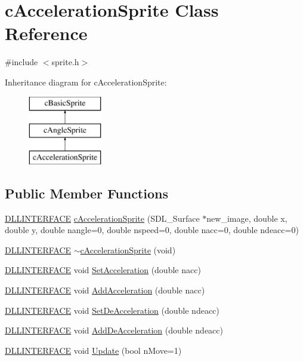 \hypertarget{classc_acceleration_sprite}{\section{c\-Acceleration\-Sprite Class Reference}
\label{classc_acceleration_sprite}
}


{\ttfamily \#include $<$sprite.\-h$>$}

Inheritance diagram for c\-Acceleration\-Sprite\-:\begin{figure}[H]
\begin{center}
\leavevmode
\includegraphics[height=3.000000cm]{classc_acceleration_sprite}
\end{center}
\end{figure}
\subsection*{Public Member Functions}
\begin{DoxyCompactItemize}
\item 
\hyperlink{_s_d_l__ep_8h_a38dd54df4631b4daf553096353d7b20b}{D\-L\-L\-I\-N\-T\-E\-R\-F\-A\-C\-E} \hyperlink{classc_acceleration_sprite_a07f0b3c9c2e7b865ecdb766a3304e285}{c\-Acceleration\-Sprite} (S\-D\-L\-\_\-\-Surface $\ast$new\-\_\-image, double x, double y, double nangle=0, double nspeed=0, double nacc=0, double ndeacc=0)
\item 
\hyperlink{_s_d_l__ep_8h_a38dd54df4631b4daf553096353d7b20b}{D\-L\-L\-I\-N\-T\-E\-R\-F\-A\-C\-E} \hyperlink{classc_acceleration_sprite_abca957dd38abb52fb0beffee462d9755}{$\sim$c\-Acceleration\-Sprite} (void)
\item 
\hyperlink{_s_d_l__ep_8h_a38dd54df4631b4daf553096353d7b20b}{D\-L\-L\-I\-N\-T\-E\-R\-F\-A\-C\-E} void \hyperlink{classc_acceleration_sprite_a4ba3eb35fd74945412de7f8560acb7b1}{Set\-Acceleration} (double nacc)
\item 
\hyperlink{_s_d_l__ep_8h_a38dd54df4631b4daf553096353d7b20b}{D\-L\-L\-I\-N\-T\-E\-R\-F\-A\-C\-E} void \hyperlink{classc_acceleration_sprite_a90b041c3156bd208c2ab568a77dfd2d7}{Add\-Acceleration} (double nacc)
\item 
\hyperlink{_s_d_l__ep_8h_a38dd54df4631b4daf553096353d7b20b}{D\-L\-L\-I\-N\-T\-E\-R\-F\-A\-C\-E} void \hyperlink{classc_acceleration_sprite_a918537c2c8a52f48fbb20ab2fd84f6dd}{Set\-De\-Acceleration} (double ndeacc)
\item 
\hyperlink{_s_d_l__ep_8h_a38dd54df4631b4daf553096353d7b20b}{D\-L\-L\-I\-N\-T\-E\-R\-F\-A\-C\-E} void \hyperlink{classc_acceleration_sprite_a38c01aea0575aad008425119d7ac87fc}{Add\-De\-Acceleration} (double ndeacc)
\item 
\hyperlink{_s_d_l__ep_8h_a38dd54df4631b4daf553096353d7b20b}{D\-L\-L\-I\-N\-T\-E\-R\-F\-A\-C\-E} void \hyperlink{classc_acceleration_sprite_a7cea445e04f44064b25deee0b8f12a33}{Update} (bool n\-Move=1)
\end{DoxyCompactItemize}
